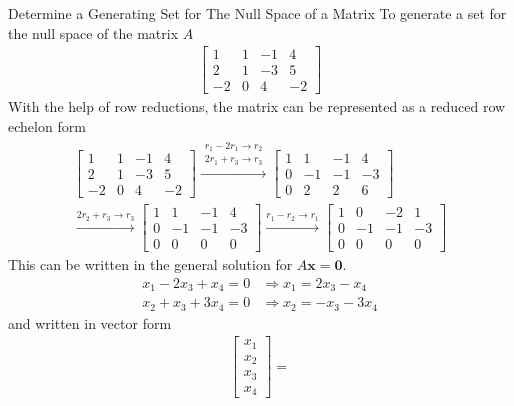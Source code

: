 \begin{example}{Determine a Generating Set for The Null Space of a Matrix }
To generate a set for the null space of the matrix $A$
\begin{align*}
    \begin{bmatrix}
    1 & 1 & -1 & 4 \\
    2 & 1 & -3 & 5\\
    -2 & 0 & 4 & -2
    \end{bmatrix}
\end{align*}
With the help of row reductions, the matrix can be represented as a reduced row echelon form
\begin{align*}
\begin{bmatrix}
    1 & 1 & -1 & 4 \\
    2 & 1 & -3 & 5\\
    -2 & 0 & 4 & -2
\end{bmatrix}\xrightarrow{\substack{r_1-2r_1\rightarrow r_2\\2r_1+r_3\rightarrow r_3}}
\begin{bmatrix}
    1 & 1 & -1 & 4 \\
    0 & -1 & -1 & -3\\
    0 & 2 & 2 & 6
\end{bmatrix}\\\xrightarrow{2r_2+r_3\rightarrow r_3}
\begin{bmatrix}
   1 & 1 & -1 & 4 \\
    0 & -1 & -1 & -3\\
    0 & 0 & 0 & 0 
\end{bmatrix}
\xrightarrow{r_1-r_2\rightarrow r_1}
\begin{bmatrix}
   1 & 0 & -2 & 1 \\
    0 & -1 & -1 & -3\\
    0 & 0 & 0 & 0
\end{bmatrix}
\end{align*}
This can be written in the general solution for $A\textbf{x}=\textbf{0}$.
\begin{align*}
    x_1 - 2x_3 + x_4 = 0 &\Rightarrow x_1 = 2x_3 - x_4\\
    x_2 + x_3 + 3x_4 = 0 &\Rightarrow x_2=-x_3 -3x_4
\end{align*}
and written in vector form
\begin{align*}
\begin{bmatrix}
   x_1\\x_2\\x_3\\x_4 
\end{bmatrix} =

\end{align*}
\end{example}
